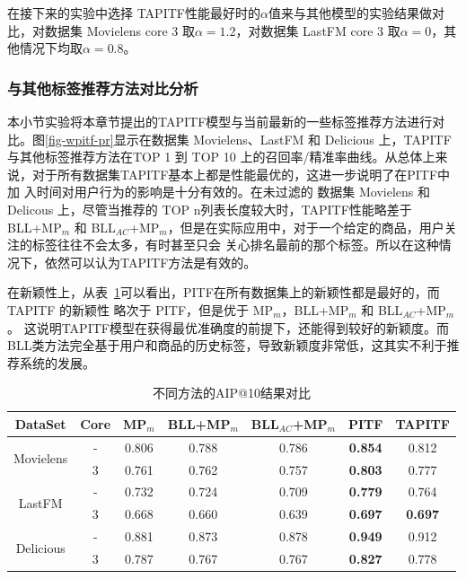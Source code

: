 在接下来的实验中选择 TAPITF性能最好时的$\alpha$值来与其他模型的实验结果做对比，对数据集 Movielens core 3 取$\alpha=1.2$，对数据集 LastFM core 3 取$\alpha=0$，其他情况下均取$\alpha=0.8$。

\subsubsection{与其他标签推荐方法对比分析}

本小节实验将本章节提出的TAPITF模型与当前最新的一些标签推荐方法进行对比。图\ref{fig-wpitf-pr}显示在数据集 Movielens、LastFM 和 Delicious 上，TAPITF与其他标签推荐方法在TOP 1 到 TOP 10 上的召回率/精准率曲线。从总体上来说，对于所有数据集TAPITF基本上都是性能最优的，这进一步说明了在PITF中加 入时间对用户行为的影响是十分有效的。在未过滤的 数据集 Movielens 和 Delicous 上，尽管当推荐的 TOP n列表长度较大时，TAPITF性能略差于BLL+MP$_m$ 和 BLL$_{AC}$+MP$_m$，但是在实际应用中，对于一个给定的商品，用户关注的标签往往不会太多，有时甚至只会 关心排名最前的那个标签。所以在这种情况下，依然可以认为TAPITF方法是有效的。

在新颖性上，从表~\ref{tab-wpitf-aip}可以看出，PITF在所有数据集上的新颖性都是最好的，而TAPITF 的新颖性 略次于 PITF，但是优于 MP$_m$，BLL+MP$_m$ 和 BLL$_{AC}$+MP$_m$。 这说明TAPITF模型在获得最优准确度的前提下，还能得到较好的新颖度。而BLL类方法完全基于用户和商品的历史标签，导致新颖度非常低，这其实不利于推荐系统的发展。
\begin{table}
	\centering
	\caption{不同方法的AIP@10结果对比}
	\label{tab-wpitf-aip}%
	\begin{tabular}{|c||c|c|c|c|c|c|}
		\hline
		DataSet  & Core  & MP$_m$   & BLL+MP$_m$ & BLL$_{AC}$+MP$_m$ & PITF  & TAPITF \bigstrut \\
		\hline
		\hline
		\multirow{2}[4]{*}{Movielens } & -     & 0.806  & 0.788  & 0.786  & \textbf{0.854 } & 0.812  \bigstrut\\
		\cline{2-7}          & 3     & 0.761  & 0.762  & 0.757  & \textbf{0.803 } & 0.777  \bigstrut\\
		\hline
		\multirow{2}[4]{*}{LastFM } & -     & 0.732  & 0.724  & 0.709  & \textbf{0.779 } & 0.764 \bigstrut \\
		\cline{2-7}          & 3     & 0.668  & 0.660  & 0.639  & \textbf{0.697 } & \textbf{0.697 } \bigstrut\\
		\hline
		\multirow{2}[4]{*}{Delicious } & -     & 0.881  & 0.873  & 0.878  & \textbf{0.949 } & 0.912 \bigstrut \\
		\cline{2-7}          & 3     & 0.787  & 0.767  & 0.767  & \textbf{0.827 } & 0.778 \bigstrut \\
		\hline
	\end{tabular}%
	
\end{table}%
